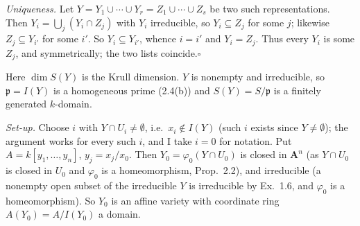 \documentclass[11pt]{article}
\begin{document}
\emph{Uniqueness.} Let $Y=Y_1\cup\cdots\cup Y_r=Z_1\cup\cdots\cup Z_s$ be two such representations. Then $Y_i=\bigcup_j(Y_i\cap Z_j)$ with $Y_i$ irreducible, so $Y_i\subseteq Z_j$ for some $j$; likewise $Z_j\subseteq Y_{i'}$ for some $i'$. So $Y_i\subseteq Y_{i'}$, whence $i=i'$ and $Y_i=Z_j$. Thus every $Y_i$ is some $Z_j$, and symmetrically; the two lists coincide.\hfill$\square$

\pf
Here $\dim S(Y)$ is the Krull dimension. $Y$ is nonempty and irreducible, so $\mathfrak p=I(Y)$ is a homogeneous prime (2.4(b)) and $S(Y)=S/\mathfrak p$ is a finitely generated $k$-domain.

\emph{Set-up.} Choose $i$ with $Y\cap U_i\neq\emptyset$, i.e.\ $x_i\notin I(Y)$ (such $i$ exists since $Y\ne\emptyset$); the argument works for every such $i$, and I take $i=0$ for notation. Put $A=k[y_1,\dots,y_n]$, $y_j=x_j/x_0$. Then $Y_0=\varphi_0(Y\cap U_0)$ is closed in $\mathbf A^n$ (as $Y\cap U_0$ is closed in $U_0$ and $\varphi_0$ is a homeomorphism, Prop.~2.2), and irreducible (a nonempty open subset of the irreducible $Y$ is irreducible by Ex.~1.6, and $\varphi_0$ is a homeomorphism). So $Y_0$ is an affine variety with coordinate ring $A(Y_0)=A/I(Y_0)$ a domain.
\end{document}
